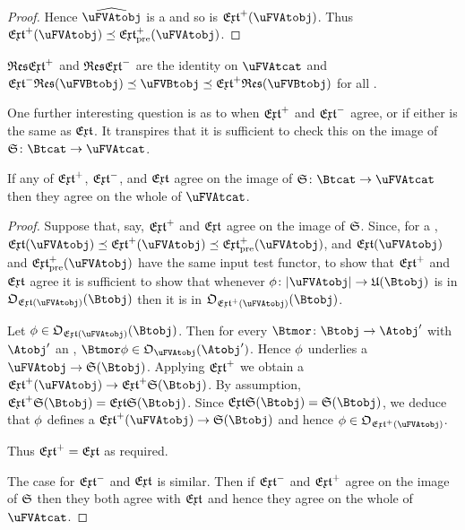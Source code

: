 \documentclass[%
a4paper,%
arxiv,%
defaults
]{myclass}
\begin{document}
\begin{proof}
Hence \(\widehat{\uFVAtobj}\) is a \uFVBtobj and so is \(\Jextfunc(\uFVAtobj)\).
Thus \(\Jextfunc(\uFVAtobj) \preceq \PJextfunc(\uFVAtobj)\).
\end{proof}

\begin{corollary}
\(\resfunc \Jextfunc\) and \(\resfunc \Mextfunc\) are the identity on \(\uFVAtcat\) and \(\Mextfunc \resfunc(\uFVBtobj) \preceq \uFVBtobj \preceq \Jextfunc \resfunc(\uFVBtobj)\) for all \uFVBtobjalts[\uFVBtobj].
 \noproof
\end{corollary}

One further interesting question is as to when \(\Jextfunc\) and \(\Mextfunc\) agree, or if either is the same as \(\extfunc\).
It transpires that it is sufficient to check this on the image of \(\sfunc \colon \Btcat \to \uFVAtcat\).

\begin{proposition}
If any of \(\Jextfunc\), \(\Mextfunc\), and \(\extfunc\) agree on the image of \(\sfunc \colon \Btcat \to \uFVAtcat\) then they agree on the whole of \(\uFVAtcat\).
\end{proposition}

\begin{proof}
Suppose that, say, \(\Jextfunc\) and \(\extfunc\) agree on the image of \(\sfunc\).
Since, for a \uFVAtobj[\uFVAtobj], \(\extfunc(\uFVAtobj) \preceq \Jextfunc(\uFVAtobj) \preceq \PJextfunc(\uFVAtobj)\), and \(\extfunc(\uFVAtobj)\) and \(\PJextfunc(\uFVAtobj)\) have the same input test functor, to show that \(\Jextfunc\) and \(\extfunc\) agree it is sufficient to show that whenever \(\ofn \colon \forfunc[\uFVAtobj] \to \ufunc(\Btobj)\) is in \(\otest_{\extfunc(\uFVAtobj)}(\Btobj)\) then it is in \(\otest_{\Jextfunc(\uFVAtobj)}(\Btobj)\).

Let \(\ofn \in \otest_{\extfunc(\uFVAtobj)}(\Btobj)\).
Then for every \(\Btmor \colon \Btobj \to \Atobj'\) with \(\Atobj'\) an \Atobjalt, \(\Btmor \ofn \in \otest_{\uFVAtobj}(\Atobj')\).
Hence \(\phi\) underlies a \uVAtmor \(\uFVAtobj \to \sfunc(\Btobj)\).
Applying \(\Jextfunc\) we obtain a \uVBtmor \(\Jextfunc(\uFVAtobj) \to \Jextfunc \sfunc(\Btobj)\).
By assumption, \(\Jextfunc \sfunc(\Btobj) = \extfunc \sfunc(\Btobj)\).
Since \(\extfunc \sfunc(\Btobj) = \sfunc(\Btobj)\), we deduce that \(\phi\) defines a \uVBtmor \(\Jextfunc(\uFVAtobj) \to \sfunc(\Btobj)\) and hence \(\ofn \in \otest_{\Jextfunc(\uFVAtobj)}\).

Thus \(\Jextfunc = \extfunc\) as required.

The case for \(\Mextfunc\) and \(\extfunc\) is similar.
Then if \(\Mextfunc\) and \(\Jextfunc\) agree on the image of \(\sfunc\) then they both agree with \(\extfunc\) and hence they agree on the whole of \(\uFVAtcat\).
\end{proof}
\end{document}
